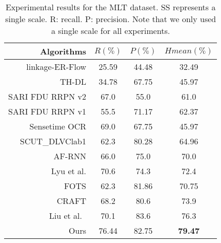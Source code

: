    \begin{table}[!t]
    \caption{Experimental results for the MLT dataset. SS represents a single scale. R: recall. P: precision. Note that we only used a single scale for all experiments. }
    \label{tab:mlt}
    \centering
    \newcommand{\tabincell}[2]{\begin{tabular}{@{}#1@{}}#2\end{tabular}}
    \small
\begin{tabular}{r |ccc}
      \hline
      Algorithms  & $R (\%)$  & $P (\%)$ & $Hmean (\%)$ \\
      \hline
      \hline
      linkage-ER-Flow  \cite{nayef2017icdar2017} & 25.59 & 44.48 & 32.49 \\
      \hline
      TH-DL  \cite{nayef2017icdar2017} & 34.78 & 67.75 & 45.97 \\
      \hline
      SARI FDU RRPN v2 \cite{ma2018arbitrary} & 67.0 & 55.0 & 61.0 \\
      \hline
      SARI FDU RRPN v1 \cite{ma2018arbitrary} & 55.5 & 71.17 & 62.37 \\
      \hline
      Sensetime OCR \cite{nayef2017icdar2017} & 69.0 & 67.75 & 45.97 \\
      \hline
      SCUT\_DLVClab1 \cite{liu2017deep} & 62.3 & 80.28 & 64.96 \\
      \hline
      AF-RNN  \cite{zhong2018anchor} & 66.0 & 75.0 & 70.0 \\
      \hline
      Lyu et al. \cite{lyu2018multi} & 70.6 & 74.3 & 72.4 \\
      \hline
      FOTS \cite{liu2018fots} & 62.3 & 81.86 & 70.75 \\
      \hline
      CRAFT \cite{baek2019character} & 68.2 & 80.6 & 73.9 \\
      \hline\hline
      Liu et al.\  \cite{liu2019omnidirectional}  & 70.1 & 83.6 & 76.3 \\
      \hline
      Ours & 76.44 & 82.75 & \textbf{79.47} \\
      \hline
    \end{tabular}
    \end{table}
  
